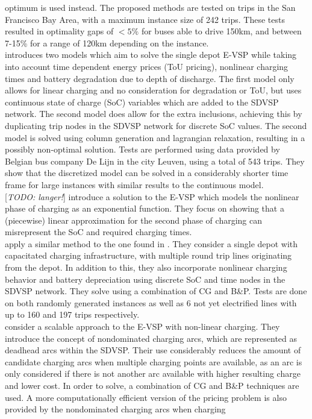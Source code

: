 \documentclass[]{article}
\makeatletter
\newcommand{\todo}[1]{{\color{red}[\textit{TODO: #1}]}}
\newcommand{\citetnl}[1]{%
  \@firstofone{\citet{#1}}}
\makeatother
\begin{document}
optimum is used instead. The proposed methods are tested on trips in the San Francisco Bay
Area, with a maximum instance size of 242 trips. These tests resulted in
optimality gaps of $<5\%$ for buses able to drive 150km, and between 7-15\%
for a range of 120km depending on the instance. \\
\citetnl{vanKootenNiekerk2017} introduces two models which aim to solve the single depot E-VSP
while taking into account time dependent energy prices (ToU pricing), nonlinear charging times and
battery degradation due to depth of discharge. The first model only allows for linear charging and no consideration for degradation or ToU, but uses continuous state of charge (SoC) variables which are added to the SDVSP network. The second model does allow for the extra inclusions, achieving this by duplicating trip nodes in the SDVSP network for discrete SoC values. The second model is solved using column generation and lagrangian relaxation, resulting in a possibly non-optimal solution. Tests are performed using data provided by Belgian bus company De Lijn in the city Leuven, using a total of 543 trips. They show that the
discretized model can be solved in a considerably shorter time frame for large instances with similar results to
the continuous model. \\
\todo{langer!}
\citet{Olsen2020} introduce a solution to the E-VSP which models the nonlinear phase of charging as an exponential function. They focus on showing that a (piecewise) linear approximation for the second phase of charging can misrepresent the SoC and required charging times. \\
\citet{Zhang2021} apply a similar method to the one found in . They consider a single depot with capacitated charging infrastructure,
with multiple round trip lines originating from the depot. In addition to this, they also incorporate nonlinear charging behavior and battery depreciation using discrete SoC and time nodes in the SDVSP network. They solve using a combination of CG and B\&P. Tests are done on both randomly generated instances as well as 6 not yet electrified lines with up to 160 and 197 trips
respectively.\\
\citet{Parmentier2023} consider a scalable approach to the E-VSP with non-linear charging. They introduce the concept of nondominated charging arcs, which are represented as deadhead arcs within the SDVSP. Their use considerably reduces the amount of candidate charging arcs when multiple charging points are available, as an arc is only considered if there is not another arc available with higher resulting charge and lower cost. In order to solve, a combination of CG and B\&P techniques are used. A more computationally efficient version of the pricing problem is also provided by the nondominated charging arcs when charging
\end{document}
